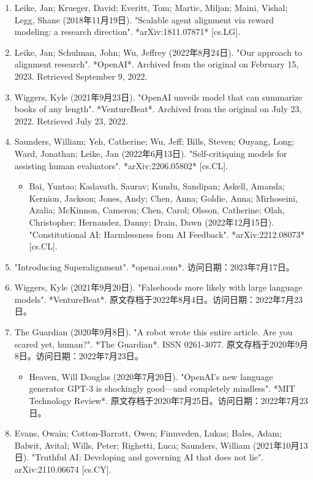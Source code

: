 \begin{enumerate}
\item Leike, Jan; Krueger, David; Everitt, Tom; Martic, Miljan; Maini, Vishal; Legg, Shane (2018年11月19日). "Scalable agent alignment via reward modeling: a research direction". *arXiv:1811.07871* [cs.LG].\item Leike, Jan; Schulman, John; Wu, Jeffrey (2022年8月24日). "Our approach to alignment research". *OpenAI*. Archived from the original on February 15, 2023. Retrieved September 9, 2022.
\item Wiggers, Kyle (2021年9月23日). "OpenAI unveils model that can summarize books of any length". *VentureBeat*. Archived from the original on July 23, 2022. Retrieved July 23, 2022.
\item Saunders, William; Yeh, Catherine; Wu, Jeff; Bills, Steven; Ouyang, Long; Ward, Jonathan; Leike, Jan (2022年6月13日). "Self-critiquing models for assisting human evaluators". *arXiv:2206.05802* [cs.CL].
\begin{itemize}
\item Bai, Yuntao; Kadavath, Saurav; Kundu, Sandipan; Askell, Amanda; Kernion, Jackson; Jones, Andy; Chen, Anna; Goldie, Anna; Mirhoseini, Azalia; McKinnon, Cameron; Chen, Carol; Olsson, Catherine; Olah, Christopher; Hernandez, Danny; Drain, Dawn (2022年12月15日). "Constitutional AI: Harmlessness from AI Feedback". *arXiv:2212.08073* [cs.CL].
\end{itemize}
\item "Introducing Superalignment". *openai.com*. 访问日期：2023年7月17日。
\item Wiggers, Kyle (2021年9月20日). "Falsehoods more likely with large language models". *VentureBeat*. 原文存档于2022年8月4日。访问日期：2022年7月23日。
\item The Guardian (2020年9月8日). "A robot wrote this entire article. Are you scared yet, human?". *The Guardian*. ISSN 0261-3077. 原文存档于2020年9月8日。访问日期：2022年7月23日。
\begin{itemize}
\item Heaven, Will Douglas (2020年7月20日). "OpenAI's new language generator GPT-3 is shockingly good—and completely mindless". *MIT Technology Review*. 原文存档于2020年7月25日。访问日期：2022年7月23日。
\end{itemize}
\item Evans, Owain; Cotton-Barratt, Owen; Finnveden, Lukas; Bales, Adam; Balwit, Avital; Wills, Peter; Righetti, Luca; Saunders, William (2021年10月13日). "Truthful AI: Developing and governing AI that does not lie". arXiv:2110.06674 [cs.CY].

\end{enumerate}
